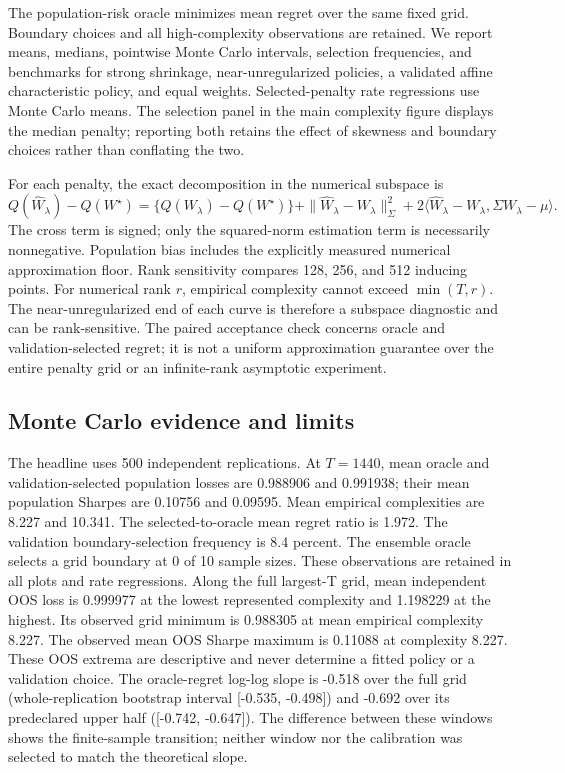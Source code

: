 The population-risk oracle minimizes mean regret over the same fixed grid.
Boundary choices and all high-complexity observations are retained. We report
means, medians, pointwise Monte Carlo intervals, selection frequencies, and
benchmarks for strong shrinkage, near-unregularized policies, a validated affine
characteristic policy, and equal weights.
Selected-penalty rate regressions use Monte Carlo means. The selection panel in
the main complexity figure displays the median penalty; reporting both retains
the effect of skewness and boundary choices rather than conflating the two.

For each penalty, the exact decomposition in the numerical subspace is
\[
Q(\widehat W_\lambda)-Q(W^\star)
=\{Q(W_\lambda)-Q(W^\star)\}
+\|\widehat W_\lambda-W_\lambda\|_{\Sigma}^2
+2\langle\widehat W_\lambda-W_\lambda,
\Sigma W_\lambda-\mu\rangle.
\]
The cross term is signed; only the squared-norm estimation term is necessarily
nonnegative. Population bias includes the explicitly measured numerical
approximation floor. Rank sensitivity compares 128, 256, and 512 inducing points.
For numerical rank $r$, empirical complexity cannot exceed $\min(T,r)$.
The near-unregularized end of each curve is therefore a subspace diagnostic
and can be rank-sensitive. The paired acceptance check concerns oracle and
validation-selected regret; it is not a uniform approximation guarantee over
the entire penalty grid or an infinite-rank asymptotic experiment.

\subsection{Monte Carlo evidence and limits}
The headline uses 500 independent replications. At $T=1440$, mean oracle and validation-selected population losses are 0.988906 and 0.991938; their mean population Sharpes are 0.10756 and 0.09595. Mean empirical complexities are 8.227 and 10.341. The selected-to-oracle mean regret ratio is 1.972. The validation boundary-selection frequency is 8.4 percent. The ensemble oracle selects a grid boundary at 0 of 10 sample sizes. These observations are retained in all plots and rate regressions. Along the full largest-T grid, mean independent OOS loss is 0.999977 at the lowest represented complexity and 1.198229 at the highest. Its observed grid minimum is 0.988305 at mean empirical complexity 8.227. The observed mean OOS Sharpe maximum is 0.11088 at complexity 8.227. These OOS extrema are descriptive and never determine a fitted policy or a validation choice. The oracle-regret log-log slope is -0.518 over the full grid (whole-replication bootstrap interval [-0.535, -0.498]) and -0.692 over its predeclared upper half ([-0.742, -0.647]). The difference between these windows shows the finite-sample transition; neither window nor the calibration was selected to match the theoretical slope.

